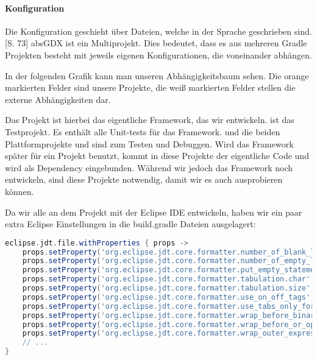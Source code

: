 \paragraph{Konfiguration}

Die Konfiguration geschieht über  Dateien, welche in der Sprache  geschrieben sind.\cite{GRADLE}[S. 73]
absGDX ist ein Multiprojekt. Dies bedeutet, dass es  aus mehreren Gradle Projekten besteht mit jeweils eigenen Konfigurationen, die voneinander abhängen. \cite[S. 79ff]{BATWG}

In der folgenden Grafik kann man unseren Abhängigkeitsbaum sehen. Die orange markierten Felder sind unsere Projekte, die weiß markierten Felder stellen die externe Abhängigkeiten dar.


Das Projekt  ist hierbei das eigentliche Framework, das wir entwickeln.  ist das Testprojekt. Es enthält alle Unit-tests für das Framework.
 und die beiden Plattformprojekte  und  sind zum Testen und Debuggen. Wird das Framework später für ein Projekt benutzt, kommt in diese Projekte der eigentliche Code und  wird als Dependency eingebunden. Während wir jedoch das Framework noch entwickeln, sind diese Projekte notwendig, damit wir es auch ausprobieren können.

Da wir alle an dem Projekt mit der Eclipse IDE entwickeln, haben wir ein paar extra Eclipse Einstellungen in die build.gradle Dateien ausgelagert:

\doinline
\begin{lstlisting}[caption=Eclipse Optionen in gradle setzen, title=\hspace{0 pt}, language=groovy]
eclipse.jdt.file.withProperties { props ->
    props.setProperty('org.eclipse.jdt.core.formatter.number_of_blank_lines_at_beginning_of_method_body', '0')
    props.setProperty('org.eclipse.jdt.core.formatter.number_of_empty_lines_to_preserve', '1')
    props.setProperty('org.eclipse.jdt.core.formatter.put_empty_statement_on_new_line', 'true')
    props.setProperty('org.eclipse.jdt.core.formatter.tabulation.char', 'tab')
    props.setProperty('org.eclipse.jdt.core.formatter.tabulation.size', '4')
    props.setProperty('org.eclipse.jdt.core.formatter.use_on_off_tags', 'false')
    props.setProperty('org.eclipse.jdt.core.formatter.use_tabs_only_for_leading_indentations', 'false')
    props.setProperty('org.eclipse.jdt.core.formatter.wrap_before_binary_operator', 'true')
    props.setProperty('org.eclipse.jdt.core.formatter.wrap_before_or_operator_multicatch', 'true')
    props.setProperty('org.eclipse.jdt.core.formatter.wrap_outer_expressions_when_nested', 'true')
    // ...
}
\end{lstlisting}

